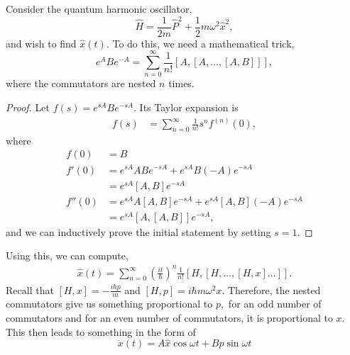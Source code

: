\documentclass{article}
\numberwithin{equation}{section}
\begin{document}
\begin{example}
    Consider the quantum harmonic oscillator,
    \begin{equation}
        \hat{H} = \frac{1}{2m}\hat{P}^2 + \frac{1}{2}m\omega^2\hat{x}^2,
    \end{equation}
    and wish to find $\hat{x}(t).$ To do this, we need a mathematical trick,
    \begin{equation}
        e^{A}Be^{-A} = \sum_{n=0}^{\infty}\frac{1}{n!}[A,[A,\dots,[A,B]]],
    \end{equation}
    where the commutators are nested $n$ times.
    \begin{proof}
        Let $f(s) = e^{sA}Be^{-sA}.$ Its Taylor expansion is
        \begin{align}
            f(s) &= \sum_{n=0}^{\infty} \frac{1}{n!}s^n f^{(n)}(0),
        \end{align}
        where
        \begin{align}
            f(0) &= B \\ 
            f'(0) &= e^{sA}ABe^{-sA}+e^{sA}B(-A)e^{-sA} \\ 
            &= e^{sA}[A,B]e^{-sA} \\ 
            f''(0) &= e^{sA}A[A,B]e^{-sA}+e^{sA}[A,B](-A)e^{-sA} \\
            &= e^{sA}[A,[A,B]]e^{-sA},
        \end{align}
        and we can inductively prove the initial statement by setting $s=1.$
    \end{proof}
    Using this, we can compute,
    \begin{align}
        \hat{x}(t) = \sum_{n=0}^{\infty}\left(\frac{it}{\hbar}\right)^n \frac{1}{n!}[H,[H,\dots,[H,x]\dots]].
    \end{align}
    Recall that $[H,x] = -\frac{i\hbar p}{m}$ and $[H,p] = i\hbar m\omega^2 x.$ Therefore, the nested commutators give us something proportional to $p,$ for an odd number of commutators and for an even number of commutators, it is proportional to $x.$ This then leads to something in the form of 
    \begin{equation}
        \dot{x}(t) = A\hat{x}\cos\omega t + B\hat{p}\sin\omega t
    \end{equation}
\end{example}
\end{document}

